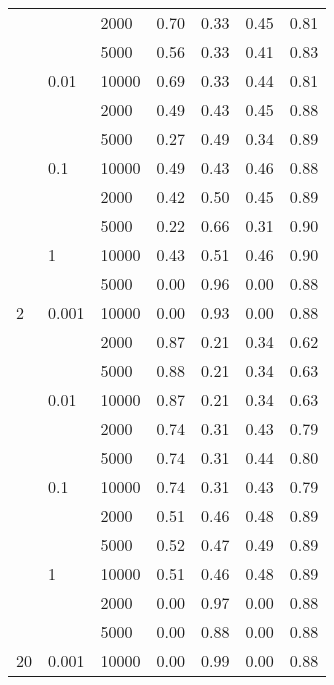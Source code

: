 \begin{tabular}{lllrrrr}
      &       & 2000 &       0.70 &       0.33 &       0.45 &       0.81 \\
      &       & 5000 &       0.56 &       0.33 &       0.41 &       0.83 \\
      & 0.01 & 10000 &       0.69 &       0.33 &       0.44 &       0.81 \\
      &       & 2000 &       0.49 &       0.43 &       0.45 &       0.88 \\
      &       & 5000 &       0.27 &       0.49 &       0.34 &       0.89 \\
      & 0.1 & 10000 &       0.49 &       0.43 &       0.46 &       0.88 \\
      &       & 2000 &       0.42 &       0.50 &       0.45 &       0.89 \\
      &       & 5000 &       0.22 &       0.66 &       0.31 &       0.90 \\
      & 1 & 10000 &       0.43 &       0.51 &       0.46 &       0.90 \\
      &       & 5000 &       0.00 &       0.96 &       0.00 &       0.88 \\
2 & 0.001 & 10000 &       0.00 &       0.93 &       0.00 &       0.88 \\
      &       & 2000 &       0.87 &       0.21 &       0.34 &       0.62 \\
      &       & 5000 &       0.88 &       0.21 &       0.34 &       0.63 \\
      & 0.01 & 10000 &       0.87 &       0.21 &       0.34 &       0.63 \\
      &       & 2000 &       0.74 &       0.31 &       0.43 &       0.79 \\
      &       & 5000 &       0.74 &       0.31 &       0.44 &       0.80 \\
      & 0.1 & 10000 &       0.74 &       0.31 &       0.43 &       0.79 \\
      &       & 2000 &       0.51 &       0.46 &       0.48 &       0.89 \\
      &       & 5000 &       0.52 &       0.47 &       0.49 &       0.89 \\
      & 1 & 10000 &       0.51 &       0.46 &       0.48 &       0.89 \\
      &       & 2000 &       0.00 &       0.97 &       0.00 &       0.88 \\
      &       & 5000 &       0.00 &       0.88 &       0.00 &       0.88 \\
20 & 0.001 & 10000 &       0.00 &       0.99 &       0.00 &       0.88 \\

\end{tabular}
